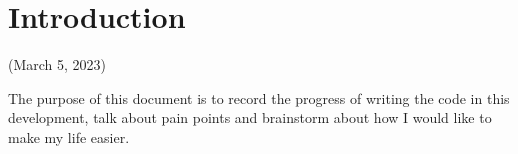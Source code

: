 \documentclass{article}
\begin{document}
\section{Introduction}
(March 5, 2023)

The purpose of this document is to record the progress of writing the
code in this development, talk about pain points and brainstorm about
how I would like to make my life easier.
\end{document}
